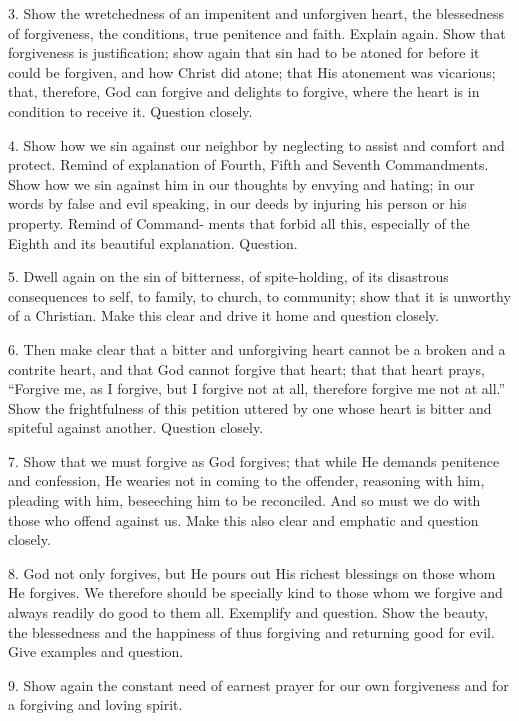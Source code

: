 3. Show the wretchedness of an impenitent and unforgiven heart, the blessedness of forgiveness, the conditions, true penitence and faith. Explain again. Show that forgiveness is justification; show again that sin had to be atoned for before it could be forgiven, and how Christ did atone; that His atonement was vicarious; that, therefore, God can forgive and delights to forgive, where the heart is in condition to receive it.  Question closely.

4. Show how we sin against our neighbor by neglecting to assist and comfort and protect. Remind of explanation of Fourth, Fifth and Seventh Commandments. Show how we sin against him in our thoughts by envying and hating; in our words by false and evil speaking, in our deeds by injuring his person or his property. Remind of Command- 
ments that forbid all this, especially of the Eighth and its beautiful explanation. Question.

5. Dwell again on the sin of bitterness, of spite-holding, of its disastrous consequences to self, to family, to church, to community; show that it is unworthy of a Christian. Make this clear and drive it home and question closely.

6. Then make clear that a bitter and unforgiving heart cannot be a broken and a contrite heart, and that God cannot forgive that heart; that that heart prays, “Forgive me, as I forgive, but I forgive not at all, therefore forgive me not at all.” Show the frightfulness of this petition uttered by one whose heart is bitter and spiteful against another. Question closely. 

7. Show that we must forgive as God forgives; that while He demands penitence and confession, He wearies not in coming to the offender, reasoning with him, pleading with him, beseeching him to be reconciled. And so must we do with those who offend against us. Make this also clear and emphatic and question closely.

8. God not only forgives, but He pours out His richest blessings on those whom He forgives. We therefore should be specially kind to those whom we forgive and always readily do good to them all.  Exemplify and question. Show the beauty, the blessedness and the happiness of thus forgiving and
returning good for evil. Give examples and question.

9. Show again the constant need of earnest prayer for our own forgiveness and for a forgiving and loving spirit.

